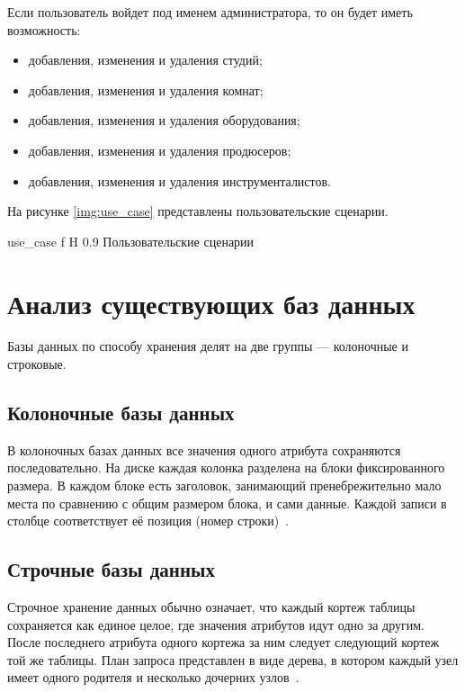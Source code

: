Если пользователь войдет под именем администратора, то он будет иметь возможность:
\begin{itemize}
	\item добавления, изменения и удаления студий;
	\item добавления, изменения и удаления комнат;
	\item добавления, изменения и удаления оборудования;
	\item добавления, изменения и удаления продюсеров;
	\item добавления, изменения и удаления инструменталистов.
\end{itemize}
		
На рисунке \ref{img:use_case} представлены пользовательские сценарии.


{use_case} %
{f} %
{H} %
{0.9\textwidth} %
{Пользовательские сценарии} %



\section{Анализ существующих баз данных}
Базы данных по способу хранения делят на две группы --- колоночные и строковые.

\subsection{Колоночные базы данных}
В колоночных базах данных все значения одного атрибута сохраняются последовательно. На диске каждая колонка разделена на блоки фиксированного размера.
В каждом блоке есть заголовок, занимающий пренебрежительно мало места по сравнению с общим размером блока, и сами данные.
Каждой записи в столбце соответствует её позиция (номер строки)~\cite{strokovie_and_kolonochnie_bd}.
\subsection{Строчные базы данных}
Строчное хранение данных обычно означает, что каждый кортеж таблицы сохраняется как единое целое, где значения атрибутов идут одно за другим.
После последнего атрибута одного кортежа за ним следует следующий кортеж той же таблицы.
План запроса представлен в виде дерева, в котором каждый узел имеет одного родителя и несколько дочерних узлов~\cite{strokovie_and_kolonochnie_bd}.



